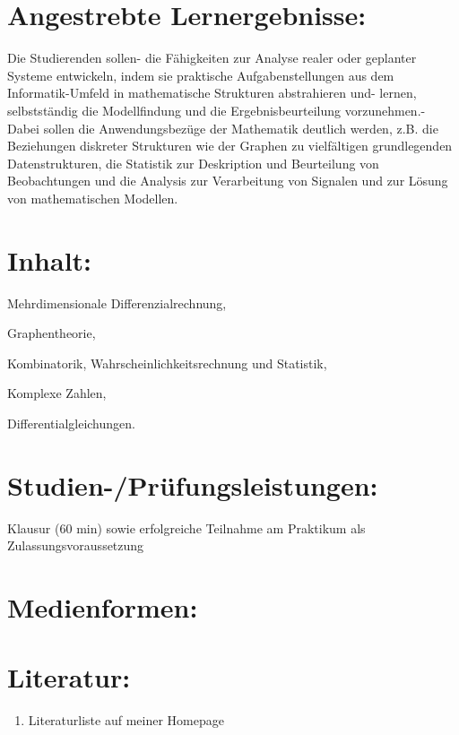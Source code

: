\section{Angestrebte
Lernergebnisse:}\label{angestrebte-lernergebnisse-14}

Die Studierenden sollen- die Fähigkeiten zur Analyse realer oder
geplanter Systeme entwickeln, indem sie praktische Aufgabenstellungen
aus dem Informatik-Umfeld in mathematische Strukturen abstrahieren und-
lernen, selbstständig die Modellfindung und die Ergebnisbeurteilung
vorzunehmen.- Dabei sollen die Anwendungsbezüge der Mathematik deutlich
werden, z.B. die Beziehungen diskreter Strukturen wie der Graphen zu
vielfältigen grundlegenden Datenstrukturen, die Statistik zur
Deskription und Beurteilung von Beobachtungen und die Analysis zur
Verarbeitung von Signalen und zur Lösung von mathematischen Modellen.

\section{Inhalt:}\label{inhalt-14}

Mehrdimensionale Differenzialrechnung,

Graphentheorie,

Kombinatorik, Wahrscheinlichkeitsrechnung und Statistik,

Komplexe Zahlen,

Differentialgleichungen.

\section{Studien-/Prüfungsleistungen:}\label{studien-pruxfcfungsleistungen-14}

Klausur (60 min) sowie erfolgreiche Teilnahme am Praktikum als
Zulassungsvoraussetzung

\section{Medienformen:}\label{medienformen-14}

\section{Literatur:}\label{literatur-14}

\begin{enumerate}
\def\labelenumi{\alph{enumi}.}
\setcounter{enumi}{18}
\tightlist
\item
  Literaturliste auf meiner Homepage
\end{enumerate}


